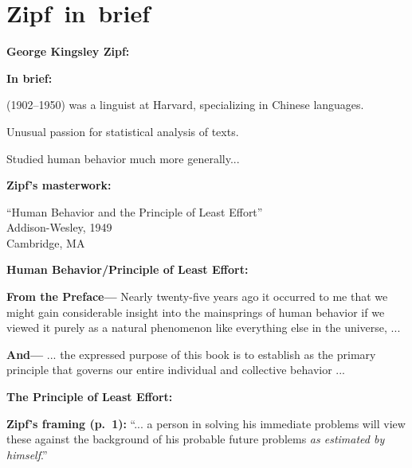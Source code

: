 \section{Zipf\ in\ brief}

  \textbf{George Kingsley Zipf:}

  \textbf{In brief:}
    
     
       (1902--1950) was a linguist at Harvard, specializing
      in Chinese languages.
    
      Unusual passion for statistical analysis of texts.
    
      Studied human behavior much more generally...
    
  

  \textbf{Zipf's masterwork:}
    
     
    ``Human Behavior and the Principle of Least Effort''\\
    Addison-Wesley, 1949\\
    Cambridge, MA\cite{zipf1949a}
    
  
  
  
  
    
  
  


  \textbf{Human Behavior/Principle of Least Effort:}

  \textbf{From the Preface---}
    Nearly twenty-five years ago it occurred to me that we might gain
    considerable insight into the mainsprings of human behavior
    if we viewed it purely as a natural phenomenon like everything
    else in the universe, ...
  

  \textbf{And---}
    ... the expressed purpose of this book is to establish
    as the primary principle 
    that governs our entire individual and collective behavior ...
  


  \textbf{The Principle of Least Effort:}

  \textbf{Zipf's framing (p.\ 1):}
    ``... a person in solving his immediate problems
    will view these against the background of his probable
    future problems \textit{as estimated by himself}.''

